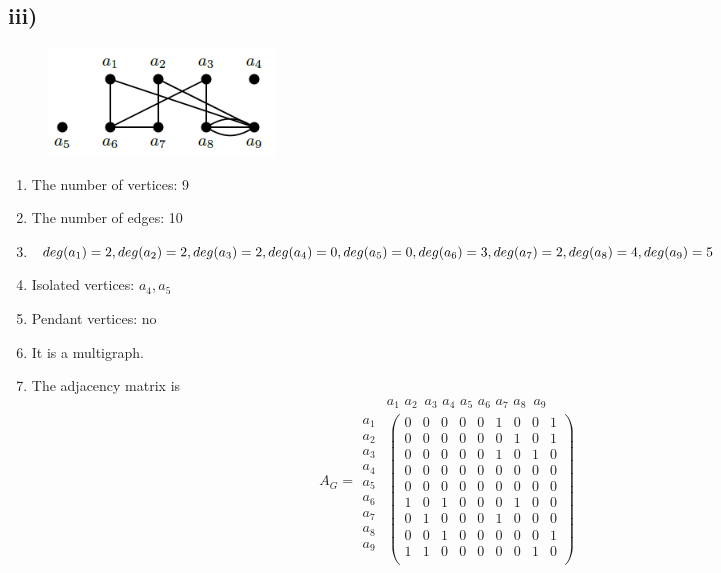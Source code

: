 \documentclass[a4paper,12pt,titlepage]{article}
\begin{document}
\subsection*{iii)}
\begin{figure}[H]
    \centering
    \includegraphics[width=6cm]{3.png}
\end{figure}
\begin{enumerate}
\item The number of vertices: 9
\item The number of edges: 10
\item $deg(a_1)=2,deg(a_2)=2,deg(a_3)=2,deg(a_4)=0,deg(a_5)=0,
deg(a_6)=3,\\deg(a_7)=2,deg(a_8)=4,deg(a_9)=5$

\item Isolated vertices: $a_4,a_5$
\item Pendant vertices: no
\item It is a multigraph.
\item The adjacency matrix is
\begin{equation*} 
A_G=\begin{array}{c}
\\
a_1\\
a_2\\
a_3\\
a_4\\
a_5\\
a_6\\
a_7\\
a_8\\
a_9
\end{array} 
\begin{array}{c}   
    a_1\,\, a_2 \,\,\, a_3 \,\, a_4 \,\, a_5 \,\, a_6\,\, a_7\,\, a_8\,\,\, a_9 \\
  \left(                 
  \begin{array}{ccccccccc}   
    0 & 0 & 0 & 0 & 0 & 1 & 0 & 0 & 1\\  
    0 & 0 & 0 & 0 & 0 & 0 & 1 & 0 & 1\\
    0 & 0 & 0 & 0 & 0 & 1 & 0 & 1 & 0\\
    0 & 0 & 0 & 0 & 0 & 0 & 0 & 0 & 0\\
    0 & 0 & 0 & 0 & 0 & 0 & 0 & 0 & 0\\
    1 & 0 & 1 & 0 & 0 & 0 & 1 & 0 & 0\\
    0 & 1 & 0 & 0 & 0 & 1 & 0 & 0 & 0\\
    0 & 0 & 1 & 0 & 0 & 0 & 0 & 0 & 1\\
    1 & 1 & 0 & 0 & 0 & 0 & 0 & 1 & 0\\
  \end{array}
\right)  
\end{array}   
\end{equation*}
\end{enumerate}
\end{document}
